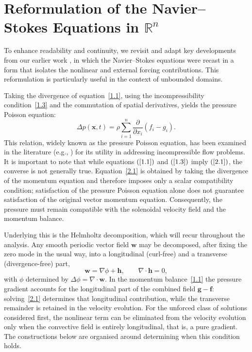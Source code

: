 \documentclass[11pt]{jfm}
\numberwithin{equation}{section}
\begin{document}
\section{Reformulation of the Navier--Stokes Equations in \( \mathbb{R}^n \)}
\label{sec:reformulation}

To enhance readability and continuity, we revisit and adapt key developments from our earlier work \cite{tha1}, in which the Navier--Stokes equations were recast in a form that isolates the nonlinear and external forcing contributions. This reformulation is particularly useful in the context of unbounded domains.

Taking the divergence of equation~\eqref{1.1}, using the incompressibility
condition~\eqref{1.3} and the commutation of spatial derivatives, yields the pressure
Poisson equation:
\begin{equation}
\label{2.1}
\Delta p(\boldsymbol{x}, t) = \rho \sum_{i=1}^n \frac{\partial}{\partial x_i}(f_i - g_i).
\end{equation}
This relation, widely known as the pressure Poisson equation, has been examined in the literature (e.g., \cite{gre}) for its utility in addressing incompressible flow problems. It is important to note that while equations $\left(\ref{1.1}\right)$ and $\left(\ref{1.3}\right)$ imply $\left(\ref{2.1}\right)$, the converse is not generally true. Equation~\eqref{2.1} is obtained by taking the divergence of the momentum equation and therefore imposes only a scalar compatibility condition; satisfaction of the pressure Poisson equation alone does not guarantee satisfaction of the original vector momentum equation. Consequently, the pressure must remain compatible with the solenoidal velocity field and the momentum balance.

Underlying this is the Helmholtz decomposition, which will recur throughout the analysis. Any
smooth periodic vector field $\boldsymbol{w}$ may be decomposed, after fixing the zero mode in the usual way,
into a longitudinal (curl-free) and a transverse (divergence-free) part,
\begin{equation}
\label{2.2}
\boldsymbol{w} = \nabla\phi + \boldsymbol{h}, \qquad \nabla\cdot\boldsymbol{h}=0,
\end{equation}
with $\phi$ determined by $\Delta\phi = \nabla\cdot\boldsymbol{w}$. In the momentum
balance~\eqref{1.1} the pressure gradient accounts for the longitudinal part of the combined field
$\boldsymbol{g}-\boldsymbol{f}$: solving~\eqref{2.1} determines that longitudinal contribution,
while the transverse remainder is retained in the velocity evolution. For the unforced class of
solutions considered first, the nonlinear term can be eliminated from the velocity evolution only
when the convective field is entirely longitudinal, that is, a pure gradient. The constructions
below are organised around determining when this condition holds.
\end{document}
